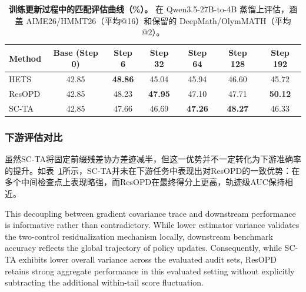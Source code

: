 \begin{table}[t]
\caption{\textbf{训练更新过程中的匹配评估曲线（\%）。}
在 Qwen3.5-27B-to-4B 蒸馏上评估，涵盖 AIME26/HMMT26（平均@16）和保留的 DeepMath/OlymMATH（平均@2）。}
\vspace{-2mm}
\label{tab:scta-curve}
\centering
\small
\setlength{\tabcolsep}{5.5pt}
\begin{tabular}{@{}lcccccc@{}}
\toprule
Method & Base (Step 0) & Step 6 & Step 32 & Step 64 & Step 128 & Step 192 \\
\midrule
HETS  & 42.85 & \textbf{48.86} & 45.04 & 45.94 & 46.60 & 45.72 \\
ResOPD   & 42.85 & 48.23 & \textbf{47.95} & 47.10 & 47.71 & \textbf{50.12} \\
SC-TA & 42.85 & 47.66 & 46.69 & \textbf{47.26} & \textbf{48.27} & 46.33 \\
\bottomrule
\end{tabular}
\vspace{-4mm}
\end{table}

\subsubsection{下游评估对比}
虽然SC-TA将固定前缀残差协方差迹减半，但这一优势并不一定转化为下游准确率的提升。如表~\ref{tab:scta-curve}所示，SC-TA并未在下游任务中表现出对ResOPD的一致优势：在多个中间检查点上表现略强，而ResOPD在最终得分上更高，轨迹级AUC保持相近。

This decoupling between gradient covariance trace and downstream performance is informative rather than contradictory. While lower estimator variance validates the two-control residualization mechanism locally, downstream benchmark accuracy reflects the global trajectory of policy updates.
Consequently, while SC-TA exhibits lower overall variance across the evaluated audit sets, ResOPD retains strong aggregate performance in this evaluated setting without explicitly subtracting the additional within-tail score fluctuation.
\vspace{-4mm}
